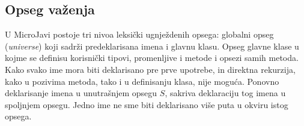 \subsection*{Opseg važenja}

U MicroJavi postoje tri nivoa leksički ugnježdenih opsega: globalni opseg (\textit{universe}) koji sadrži predeklarisana imena i glavnu klasu. Opseg glavne klase u kojme se definisu korisnički tipovi, promenljive i metode i opsezi samih metoda. Kako svako ime mora biti deklarisano pre prve upotrebe, in direktna rekurzija, kako u pozivima metoda, tako i u definisanju klasa, nije moguća. Ponovno deklarisanje imena u unutrašnjem opsegu $S$, sakriva deklaraciju tog imena u spoljnjem opsegu. Jedno ime ne sme biti deklarisano više puta u okviru istog opsega.
